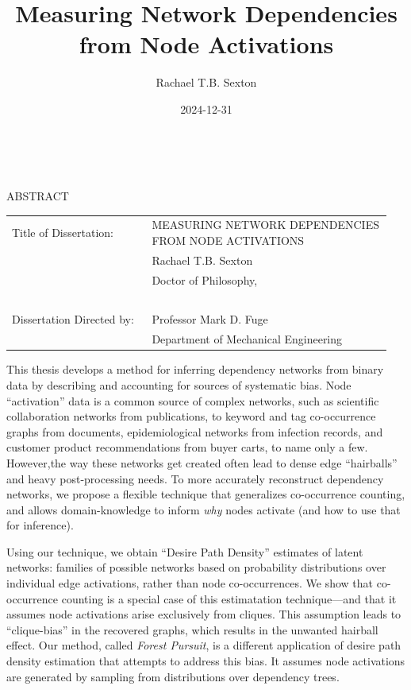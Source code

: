 \documentclass[%
	12pt,
		oneside,
		letterpaper
]{book}
\title{Measuring Network Dependencies from Node Activations}
\author{Rachael T.B. Sexton}
\date{2024-12-31}
\begin{document}
\pagestyle{empty}
\singlespacing

\hbox{\ }

\begin{center}
\large{{ABSTRACT}}

\vspace{3em}

\end{center}
\hspace{-.15in}
\begin{tabular}{p{0.35\linewidth}p{0.6\linewidth}}
Title of Dissertation:     & {\large \uppercase{Measuring Network
Dependencies from Node Activations}}\\
                           & {\large  Rachael T.B. Sexton } \\
                           & {\large Doctor of Philosophy, } \\
\                         \\
Dissertation Directed by:  & {\large Professor Mark D. Fuge } \\
                           & {\large Department of Mechanical
Engineering} \\
\end{tabular}

\vspace{3em}


\doublespacing
\large \normalsize
This thesis develops a method for inferring dependency networks from
binary data by describing and accounting for sources of systematic bias.
Node ``activation'' data is a common source of complex networks, such as
scientific collaboration networks from publications, to keyword and tag
co-occurrence graphs from documents, epidemiological networks from
infection records, and customer product recommendations from buyer
carts, to name only a few. However,the way these networks get created
often lead to dense edge ``hairballs'' and heavy post-processing needs.
To more accurately reconstruct dependency networks, we propose a
flexible technique that generalizes co-occurrence counting, and allows
domain-knowledge to inform \emph{why} nodes activate (and how to use
that for inference).

Using our technique, we obtain ``Desire Path Density'' estimates of
latent networks: families of possible networks based on probability
distributions over individual edge activations, rather than node
co-occurrences. We show that co-occurrence counting is a special case of
this estimatation technique---and that it assumes node activations arise
exclusively from cliques. This assumption leads to ``clique-bias'' in
the recovered graphs, which results in the unwanted hairball effect. Our
method, called \emph{Forest Pursuit}, is a different application of
desire path density estimation that attempts to address this bias. It
assumes node activations are generated by sampling from distributions
over dependency trees.
\end{document}
